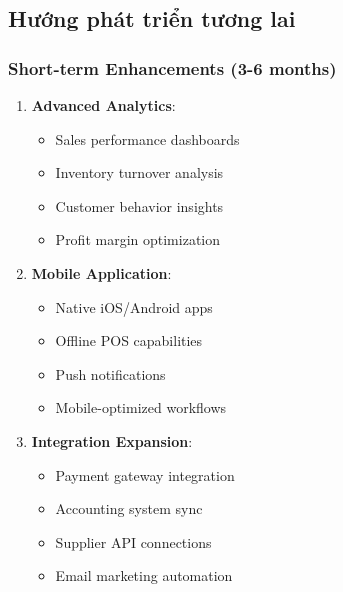 \documentclass[12pt,a4paper]{article}
\begin{document}
\subsection{Hướng phát triển tương lai}
\subsubsection{Short-term Enhancements (3-6 months)}
\begin{enumerate}
    \item \textbf{Advanced Analytics}:
       \begin{itemize}
           \item Sales performance dashboards
           \item Inventory turnover analysis
           \item Customer behavior insights
           \item Profit margin optimization
       \end{itemize}
    
    \item \textbf{Mobile Application}:
       \begin{itemize}
           \item Native iOS/Android apps
           \item Offline POS capabilities
           \item Push notifications
           \item Mobile-optimized workflows
       \end{itemize}
    
    \item \textbf{Integration Expansion}:
       \begin{itemize}
           \item Payment gateway integration
           \item Accounting system sync
           \item Supplier API connections
           \item Email marketing automation
       \end{itemize}
\end{enumerate}
\end{document}
